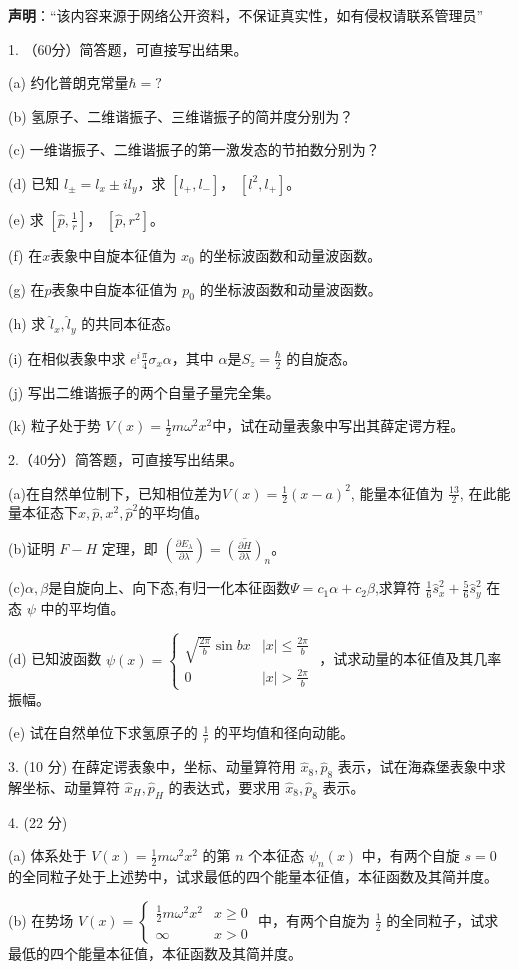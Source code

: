 
\textbf{声明}：“该内容来源于网络公开资料，不保证真实性，如有侵权请联系管理员”

1. （60分）简答题，可直接写出结果。

(a) 约化普朗克常量$\hbar = ?$

(b) 氢原子、二维谐振子、三维谐振子的简并度分别为？

(c) 一维谐振子、二维谐振子的第一激发态的节拍数分别为？

(d) 已知 $l_\pm = l_x \pm il_y $，求 $[l_+, l_-]$， $[l^2, l_+]$。

(e) 求 $[\hat p, \frac{1}{r}]$， $[\hat p, r^2]$。

(f) 在$x$表象中自旋本征值为 $x_0$ 的坐标波函数和动量波函数。

(g) 在$p$表象中自旋本征值为 $p_0$ 的坐标波函数和动量波函数。

(h) 求 $\hat l_x,\hat l_y$ 的共同本征态。

(i) 在相似表象中求 $e^i\frac{\pi}{4}\sigma_x\alpha$，其中 $\alpha$是$S_z =\frac{\hbar}{2} $ 的自旋态。

(j) 写出二维谐振子的两个自量子量完全集。

(k) 粒子处于势 $V(x) = \frac{1}{2}m\omega^2x^2$中，试在动量表象中写出其薛定谔方程。

2.（40分）简答题，可直接写出结果。

(a)在自然单位制下，已知相位差为$V(x) = \frac{1}{2} (x-a)^2$, 能量本征值为 $\frac{13}{2}$, 在此能量本征态下$x,\hat p,x^2,\hat p^2$的平均值。

(b)证明 $F-H$ 定理，即 
$\left( \frac{\partial E_{\lambda}}{\partial \lambda} \right) = \overline{(\frac{\partial H}{\partial \lambda})} _n$。

(c)$\alpha,\beta$是自旋向上、向下态,有归一化本征函数$\Psi=c_1\alpha+c_2\beta$,求算符 $\frac{1}{6}\hat s_x^2 + \frac{5}{6}\hat s_y^2$ 在态 $\psi$ 中的平均值。

(d) 已知波函数 $\psi(x) = 
\begin{cases} 
\sqrt{\frac{2\pi}{b}} \sin{bx} & |x| \leq \frac{2\pi}{b} \\
0 & |x| > \frac{2\pi}{b} 
\end{cases}$ ，试求动量的本征值及其几率振幅。

(e) 试在自然单位下求氢原子的 $\frac{1}{r}$ 的平均值和径向动能。

3. (10 分) 在薛定谔表象中，坐标、动量算符用 $\hat x_8,\hat p_8$ 表示，试在海森堡表象中求解坐标、动量算符 $\hat x_H, \hat p_{H}$ 的表达式，要求用 $\hat x_8,\hat p_8$ 表示。

4. (22 分)

(a) 体系处于 $V(x) = \frac{1}{2}m\omega^2x^2$ 的第 $n$ 个本征态 $\psi_n(x)$ 中，有两个自旋 $s = 0$ 的全同粒子处于上述势中，试求最低的四个能量本征值，本征函数及其简并度。

(b) 在势场 $V(x) = 
\begin{cases} 
\frac{1}{2}m\omega^2x^2 & x \geq 0 \\
\infty & x > 0 
\end{cases}$ 中，有两个自旋为 $\frac{1}{2}$ 的全同粒子，试求最低的四个能量本征值，本征函数及其简并度。